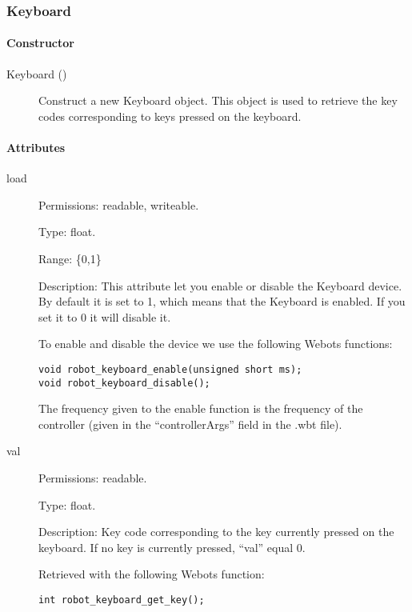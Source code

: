 \subsubsection{Keyboard}
\label{webots.uobjects.robotdevices.keyboard}%

\paragraph{Constructor}
\label{webots.uobjects.robotdevices.keyboard.constructor}%

\noindent
\begin{description}
\item[{Keyboard ()}]      Construct a new Keyboard object. This object is used to retrieve the
          key codes corresponding to keys pressed on the keyboard.

\end{description}

\paragraph{Attributes}
\label{webots.uobjects.robotdevices.keyboard.attributes}%

\noindent
\begin{description}
\item[{load}]     Permissions: readable, writeable.


  Type: float.


  Range: \{0,1\}


  Description: This attribute let you enable or disable the Keyboard
  device.  By default it is set to 1, which means that the Keyboard is
  enabled. If you set it to 0 it will disable it.


          To enable and disable the device we use the following Webots functions:


\begin{lstlisting}
void robot_keyboard_enable(unsigned short ms);
void robot_keyboard_disable();
\end{lstlisting}

          The frequency given to the enable function is the frequency of the
          \urbi controller (given in the ``controllerArgs'' field in the .wbt file).

\item[{         val
 }]            Permissions: readable.


 Type: float.


 Description: Key code corresponding to the key currently pressed on
 the keyboard. If no key is currently pressed, ``val'' equal 0.


          Retrieved with the following Webots function:


\begin{lstlisting}
int robot_keyboard_get_key();
\end{lstlisting}
\end{description}

